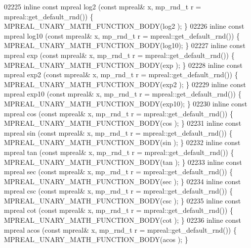 \begin{DoxyCode}
{{02225 \textcolor{keyword}{inline} \textcolor{keyword}{const} mpreal log2  (\textcolor{keyword}{const} mpreal& x, mp\_rnd\_t r = mpreal::get\_default\_rnd()) \{   
      MPREAL\_UNARY\_MATH\_FUNCTION\_BODY(log2 );    \}
02226 \textcolor{keyword}{inline} \textcolor{keyword}{const} mpreal log10 (\textcolor{keyword}{const} mpreal& x, mp\_rnd\_t r = mpreal::get\_default\_rnd()) \{   
      MPREAL\_UNARY\_MATH\_FUNCTION\_BODY(log10);    \}
02227 \textcolor{keyword}{inline} \textcolor{keyword}{const} mpreal exp   (\textcolor{keyword}{const} mpreal& x, mp\_rnd\_t r = mpreal::get\_default\_rnd()) \{   
      MPREAL\_UNARY\_MATH\_FUNCTION\_BODY(exp  );    \}
02228 \textcolor{keyword}{inline} \textcolor{keyword}{const} mpreal exp2  (\textcolor{keyword}{const} mpreal& x, mp\_rnd\_t r = mpreal::get\_default\_rnd()) \{   
      MPREAL\_UNARY\_MATH\_FUNCTION\_BODY(exp2 );    \}
02229 \textcolor{keyword}{inline} \textcolor{keyword}{const} mpreal exp10 (\textcolor{keyword}{const} mpreal& x, mp\_rnd\_t r = mpreal::get\_default\_rnd()) \{   
      MPREAL\_UNARY\_MATH\_FUNCTION\_BODY(exp10);    \}
02230 \textcolor{keyword}{inline} \textcolor{keyword}{const} mpreal cos   (\textcolor{keyword}{const} mpreal& x, mp\_rnd\_t r = mpreal::get\_default\_rnd()) \{   
      MPREAL\_UNARY\_MATH\_FUNCTION\_BODY(cos  );    \}
02231 \textcolor{keyword}{inline} \textcolor{keyword}{const} mpreal sin   (\textcolor{keyword}{const} mpreal& x, mp\_rnd\_t r = mpreal::get\_default\_rnd()) \{   
      MPREAL\_UNARY\_MATH\_FUNCTION\_BODY(sin  );    \}
02232 \textcolor{keyword}{inline} \textcolor{keyword}{const} mpreal tan   (\textcolor{keyword}{const} mpreal& x, mp\_rnd\_t r = mpreal::get\_default\_rnd()) \{   
      MPREAL\_UNARY\_MATH\_FUNCTION\_BODY(tan  );    \}
02233 \textcolor{keyword}{inline} \textcolor{keyword}{const} mpreal sec   (\textcolor{keyword}{const} mpreal& x, mp\_rnd\_t r = mpreal::get\_default\_rnd()) \{   
      MPREAL\_UNARY\_MATH\_FUNCTION\_BODY(sec  );    \}
02234 \textcolor{keyword}{inline} \textcolor{keyword}{const} mpreal csc   (\textcolor{keyword}{const} mpreal& x, mp\_rnd\_t r = mpreal::get\_default\_rnd()) \{   
      MPREAL\_UNARY\_MATH\_FUNCTION\_BODY(csc  );    \}
02235 \textcolor{keyword}{inline} \textcolor{keyword}{const} mpreal cot   (\textcolor{keyword}{const} mpreal& x, mp\_rnd\_t r = mpreal::get\_default\_rnd()) \{   
      MPREAL\_UNARY\_MATH\_FUNCTION\_BODY(cot  );    \}
02236 \textcolor{keyword}{inline} \textcolor{keyword}{const} mpreal acos  (\textcolor{keyword}{const} mpreal& x, mp\_rnd\_t r = mpreal::get\_default\_rnd()) \{   
      MPREAL\_UNARY\_MATH\_FUNCTION\_BODY(acos );    \}
}}
\end{DoxyCode}
